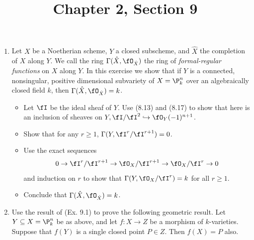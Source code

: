 \documentclass[a4paper]{article}
\title{Chapter 2, Section 9}
\begin{document}
\maketitle

\begin{enumerate} [label=\textbf{\arabic*.}, leftmargin=0em]

    \item Let $X$ be a Noetherian scheme, $Y$ a closed subscheme, and $\hat{X}$ the completion of $X$ along $Y$. We call the ring $\Gamma(\hat{X}, \fO_{\hat{X}})$ the ring of \textit{formal-regular functions} on $X$ along $Y$. In this exercise we show that if $Y$ is a connected, nonsingular, positive dimensional subvariety of $X = \P_k^n$ over an algebraically closed field $k$, then $\Gamma(\hat{X}, \fO_{\hat{X}}) = k$.
          \begin{itemize}
              \item[(a)] Let $\fI$ be the ideal sheaf of $Y$. Use (8.13) and (8.17) to show that here is an inclusion of sheaves on $Y, \fI / \fI^2 \hookrightarrow \fO_Y(-1)^{n + 1}$.
              \item[(b)] Show that for any $r \geq 1$, $\Gamma(Y, \fI^r / \fI^{r + 1}) = 0$.
              \item[(c)] Use the exact sequences
                    \begin{equation*}
                        0 \to \fI^r / \fI^{r + 1} \to \fO_X / \fI^{r + 1} \to \fO_X / \fI^r \to 0
                    \end{equation*}
                    and induction on $r$ to show that $\Gamma(Y, \fO_X/\fI^r) = k$ for all $r \geq 1$.
              \item[(d)] Conclude that $\Gamma(\hat{X}, \fO_{\hat{X}}) = k$.
          \end{itemize}

    \item Use the result of (Ex. 9.1) to prove the following geometric result. Let $Y \subseteq X = \P_k^n$ be as above, and let $f : X \to Z$ be a morphism of $k$-varieties. Suppose that $f(Y)$ is a single closed point $P \in Z$. Then $f(X) = P$ also.


\end{enumerate}
\end{document}
